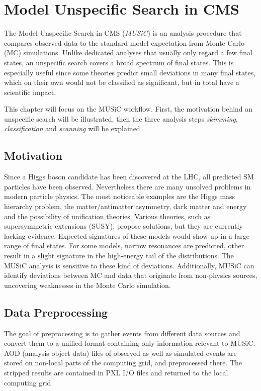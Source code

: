 
\chapter{Model Unspecific Search in CMS}

The Model Unspecific Search in CMS (\emph{MUSiC})\cite{Pieta2012MUSiC,Papacz2014Model} is an analysis procedure that compares observed data to the standard model expectation from Monte Carlo (MC) simulations. Unlike dedicated analyses that usually only regard a few final states, an unspecific search covers a broad spectrum of final states.
This is especially useful since some theories predict small deviations in many final states, which on their own would not be classified as significant, but in total have a scientific impact.

This chapter will focus on the MUSiC workflow. First, the motivation behind an unspecific search will be illustrated, then the three analysis steps \emph{skimming}, \emph{classification} and \emph{scanning} will be explained.

\section{Motivation}
Since a Higgs boson candidate has been discovered at the LHC\cite{Ao2015Combined}, all predicted SM particles have been observed.
Nevertheless there are many unsolved problems in modern particle physics. The most noticeable examples are the Higgs mass hierarchy problem, the matter/antimatter asymmetry, dark matter and energy and the possibility of unification theories. Various theories, such as supersymmetric extensions (SUSY), propose solutions, but they are currently lacking evidence.
Expected signatures of these models would show up in a large range of final states. For some models, narrow resonances are predicted, other result in a slight signature in the high-energy tail of the distributions.
The MUSiC analysis is sensitive to these kind of deviations.
Additionally, MUSiC can identify deviations between MC and data that originate from non-physics sources, uncovering weaknesses in the Monte Carlo simulation.

\section{Data Preprocessing}
The goal of preprocessing is to gather events from different data sources and convert them to a unified format containing only information relevant to MUSiC. AOD (analysis object data) files of observed as well as simulated events are stored on non-local parts of the computing grid, and preprocessed there. The stripped results are contained in PXL I/O files\cite{BBE+2012Development} and returned to the local computing grid.

